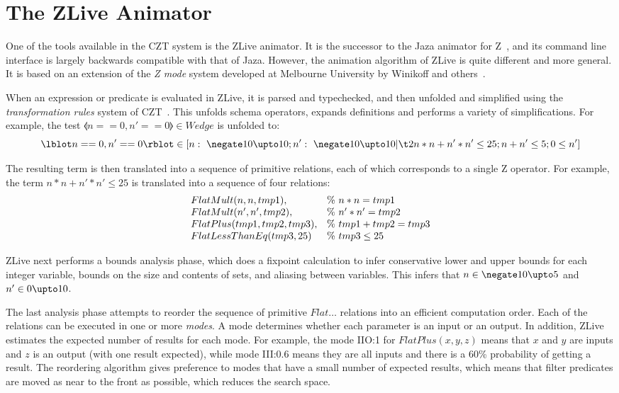 \documentclass{llncs}
\begin{document}
\section{The ZLive Animator}\label{sect:zlive}

One of the tools available in the CZT system is the ZLive animator.
It is the successor to the Jaza animator for Z~\cite{utting:jaza},
and its command line interface is largely backwards compatible with that of
Jaza.  However, the animation algorithm of ZLive is quite different and
more general.  It is based on an extension of the \emph{Z mode} system
developed at Melbourne University by Winikoff and
others~\cite{kazmierczak:animation98,winikoff:modes-subtypes98}.

When an expression or predicate is evaluated in ZLive, it is
parsed and typechecked, and then unfolded and simplified using
the \emph{transformation rules} system of CZT~\cite{utting:rules07}.
This unfolds schema operators, expands definitions and performs a
variety of simplifications.  For example, the test $\lblot n==0, n'==0
\rblot \in Wedge$ is unfolded to:
\[
  \lblot n == 0 , n' == 0 \rblot \in 
 [ n :~\negate 10 \upto 10; n' :~\negate 10 \upto 10 | \\
   \t2 n * n + n' * n'  \leq 25; n + n' \leq 5; 0 \leq n' ]
\]

The resulting term is then translated into a sequence of primitive
relations, each of which corresponds to a single Z operator.
For example, the term $n * n + n' * n'  \leq 25$ is 
translated into a sequence of four relations:
\[
\begin{array}{l@{\quad}l}
   FlatMult(n, n, tmp1),       & \%~ n * n = tmp1 \\
   FlatMult(n', n', tmp2),     & \%~ n' * n' = tmp2 \\
   FlatPlus(tmp1, tmp2, tmp3), & \%~ tmp1 + tmp2 = tmp3 \\
   FlatLessThanEq(tmp3, 25)    & \%~ tmp3 \leq 25
\end{array}
\]

ZLive next performs a bounds analysis phase, which does a fixpoint
calculation to infer conservative lower and upper bounds for each
integer variable, bounds on the size and contents of sets, and
aliasing between variables.  This infers that $n \in \negate 10 \upto
5$ and $n' \in 0 \upto 10$.

The last analysis phase attempts to reorder the sequence of primitive
$Flat\ldots$ relations into an efficient computation order.  Each of
the relations can be executed in one or more \emph{modes}.  A mode
determines whether each parameter is an input or an output.  In
addition, ZLive estimates the expected number of results for each
mode.  For example, the mode IIO:1 for $FlatPlus(x,y,z)$ means that
$x$ and $y$ are inputs and $z$ is an output (with one result
expected), while mode III:0.6 means they are all inputs and there is a
60\% probability of getting a result.  The reordering algorithm gives
preference to modes that have a small number of expected results,
which means that filter predicates are moved as near to the front as
possible, which reduces the search space.
\end{document}
